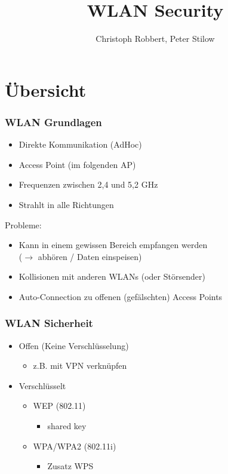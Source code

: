 \documentclass{beamer}
\author[C.Robbert, P. Stilow]{Christoph Robbert, Peter Stilow}
\institute[Uni Paderborn]{Universität Paderborn}
\title[WLAN Security]{WLAN Security}
\begin{document}
\begin{frame}
\maketitle
\end{frame}

\section{Übersicht}
\begin{frame}
\frametitle{WLAN Grundlagen}
\begin{itemize}
	\item Direkte Kommunikation (AdHoc)
	\item Access Point (im folgenden AP)
	\item Frequenzen zwischen 2,4 und 5,2 GHz
	\item Strahlt in alle Richtungen
\end{itemize}
Probleme:
\begin{itemize}
	\item Kann in einem gewissen Bereich empfangen werden \\($\rightarrow$ abhören / Daten einspeisen)
	\item Kollisionen mit anderen WLANs (oder Störsender)
	\item Auto-Connection zu offenen (gefälschten) Access Points
\end{itemize}
\end{frame}

\begin{frame}
\frametitle{WLAN Sicherheit}
\begin{itemize}
	\item Offen (Keine Verschlüsselung)
	\begin{itemize}
		\item z.B. mit VPN verknüpfen
	\end{itemize}
	\item Verschlüsselt
	\begin{itemize}
		\item WEP (802.11)
		\begin{itemize}
			\item shared key
		\end{itemize}
		\item WPA/WPA2 (802.11i)
		\begin{itemize}
			\item Zusatz WPS
		\end{itemize}
	\end{itemize}
\end{itemize}
\end{frame}
\end{document}
